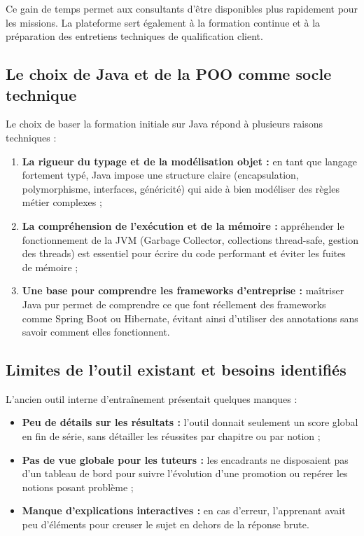 \documentclass{tnreport}
\begin{document}
Ce gain de temps permet aux consultants d'être disponibles plus rapidement pour les missions. La plateforme sert également à la formation continue et à la préparation des entretiens techniques de qualification client.

\subsection{Le choix de Java et de la POO comme socle technique}
\label{subsec:role_socle_java_poo}

Le choix de baser la formation initiale sur Java répond à plusieurs raisons techniques :
\begin{enumerate}
    \item \textbf{La rigueur du typage et de la modélisation objet :} en tant que langage fortement typé, Java impose une structure claire (encapsulation, polymorphisme, interfaces, généricité) qui aide à bien modéliser des règles métier complexes ;
    \item \textbf{La compréhension de l'exécution et de la mémoire :} appréhender le fonctionnement de la JVM (Garbage Collector, collections thread-safe, gestion des threads) est essentiel pour écrire du code performant et éviter les fuites de mémoire ;
    \item \textbf{Une base pour comprendre les frameworks d'entreprise :} maîtriser Java pur permet de comprendre ce que font réellement des frameworks comme Spring Boot ou Hibernate, évitant ainsi d'utiliser des annotations sans savoir comment elles fonctionnent.
\end{enumerate}

\subsection{Limites de l'outil existant et besoins identifiés}
\label{subsec:limites_outillage_besoins}

L'ancien outil interne d'entraînement présentait quelques manques :
\begin{itemize}
    \item \textbf{Peu de détails sur les résultats :} l'outil donnait seulement un score global en fin de série, sans détailler les réussites par chapitre ou par notion ;
    \item \textbf{Pas de vue globale pour les tuteurs :} les encadrants ne disposaient pas d'un tableau de bord pour suivre l'évolution d'une promotion ou repérer les notions posant problème ;
    \item \textbf{Manque d'explications interactives :} en cas d'erreur, l'apprenant avait peu d'éléments pour creuser le sujet en dehors de la réponse brute.
\end{itemize}
\end{document}
